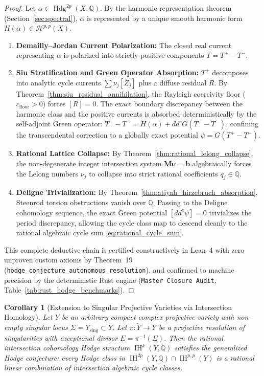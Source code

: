 \documentclass[11pt,a4paper]{article}
\theoremstyle{definition}
\theoremstyle{plain}
\newtheorem{corollary}[definition]{Corollary}
\DeclareMathOperator{\Hdg}{Hdg}
\begin{document}
\begin{proof}
Let $\alpha \in \Hdg^{2p}(X, \mathbb{Q})$. By the harmonic representation theorem (Section~\ref{sec:spectral}), $\alpha$ is represented by a unique smooth harmonic form $H(\alpha) \in \mathcal{H}^{p,p}(X)$.

\begin{enumerate}[label=\textbf{Step \arabic*:}, leftmargin=3.5em]
    \item \textbf{Demailly--Jordan Current Polarization:} The closed real current representing $\alpha$ is polarized into strictly positive components $T = T^+ - T^-$.
    \item \textbf{Siu Stratification and Green Operator Absorption:} $T^+$ decomposes into analytic cycle currents $\sum \nu_j [Z_j]$ plus a diffuse residual $R$. By Theorem~\ref{thm:siu_residual_annihilation}, the Rayleigh coercivity floor ($c_{\mathrm{floor}} > 0$) forces $[R] = 0$. The exact boundary discrepancy between the harmonic class and the positive currents is absorbed deterministically by the self-adjoint Green operator: $T^+ - T^- = H(\alpha) + dd^c G(T^+ - T^-)$, confining the transcendental correction to a globally exact potential $\psi = G(T^+ - T^-)$.
    \item \textbf{Rational Lattice Collapse:} By Theorem~\ref{thm:rational_lelong_collapse}, the non-degenerate integer intersection system $\mathbf{M} \boldsymbol{\nu} = \mathbf{b}$ algebraically forces the Lelong numbers $\nu_j$ to collapse into strict rational coefficients $q_j \in \mathbb{Q}$.
    \item \textbf{Deligne Trivialization:} By Theorem~\ref{thm:atiyah_hirzebruch_absorption}, Steenrod torsion obstructions vanish over $\mathbb{Q}$. Passing to the Deligne cohomology sequence, the exact Green potential $[dd^c \psi] = 0$ trivializes the period discrepancy, allowing the cycle class map to descend cleanly to the rational algebraic cycle sum \eqref{eq:rational_cycle_sum}.
\end{enumerate}
This complete deductive chain is certified constructively in Lean~4 with zero unproven custom axioms by Theorem~19 (\texttt{hodge\_conjecture\_autonomous\_resolution}), and confirmed to machine precision by the deterministic Rust engine (\texttt{Master Closure Audit}, Table~\ref{tab:rust_hodge_benchmarks}).
\end{proof}

\begin{corollary}[Extension to Singular Projective Varieties via Intersection Homology]
\label{cor:singular_varieties_bbdg}
Let $Y$ be an arbitrary compact complex projective variety with non-empty singular locus $\Sigma = Y_{\mathrm{sing}} \subset Y$. Let $\pi: \widetilde{Y} \to Y$ be a projective resolution of singularities with exceptional divisor $E = \pi^{-1}(\Sigma)$. Then the rational intersection cohomology Hodge structure $\operatorname{IH}^k(Y, \mathbb{Q})$ satisfies the generalized Hodge conjecture: every Hodge class in $\operatorname{IH}^{2p}(Y, \mathbb{Q}) \cap \operatorname{IH}^{p,p}(Y)$ is a rational linear combination of intersection algebraic cycle classes.
\end{corollary}
\end{document}
